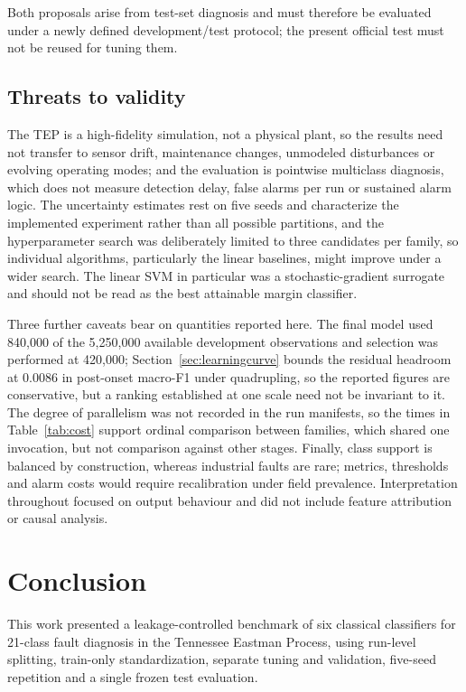 \documentclass[10pt,twocolumn,a4paper]{article}
\begin{document}
Both proposals arise from test-set diagnosis and must therefore be evaluated
under a newly defined development/test protocol; the present official test must
not be reused for tuning them.

\subsection{Threats to validity}

The TEP is a high-fidelity simulation, not a physical plant, so the results
need not transfer to sensor drift, maintenance changes, unmodeled disturbances
or evolving operating modes; and the evaluation is pointwise multiclass
diagnosis, which does not measure detection delay, false alarms per run or
sustained alarm logic. The uncertainty estimates rest on five seeds and
characterize the implemented experiment rather than all possible partitions,
and the hyperparameter search was deliberately limited to three candidates per
family, so individual algorithms, particularly the linear baselines, might
improve under a wider search. The linear SVM in particular was a
stochastic-gradient surrogate and should not be read as the best attainable
margin classifier.

Three further caveats bear on quantities reported here. The final model used
840,000 of the 5,250,000 available development observations and selection was
performed at 420,000; Section~\ref{sec:learningcurve} bounds the residual
headroom at 0.0086 in post-onset macro-F1 under quadrupling, so the reported
figures are conservative, but a ranking established at one scale need not be
invariant to it. The degree of parallelism was not recorded in the run
manifests, so the times in Table~\ref{tab:cost} support ordinal comparison
between families, which shared one invocation, but not comparison against other
stages. Finally, class support is balanced by construction, whereas industrial
faults are rare; metrics, thresholds and alarm costs would require
recalibration under field prevalence. Interpretation throughout focused on
output behaviour and did not include feature attribution or causal analysis.

\section{Conclusion}

This work presented a leakage-controlled benchmark of six classical classifiers
for 21-class fault diagnosis in the Tennessee Eastman Process, using run-level
splitting, train-only standardization, separate tuning and validation,
five-seed repetition and a single frozen test evaluation.
\end{document}
